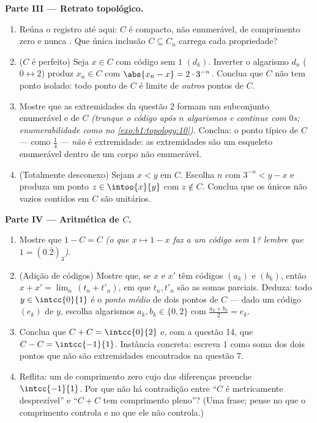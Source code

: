 \begin{problem}[{Problema de fim de semana --- o \omterm{pb:b1:topology:1}{conjunto de Cantor}
dos terços médios: comprimento zero, não enumerável, perfeito e $C + C =
\intcc{0}{2}$}]
\medskip
\noindent\textbf{Parte III --- Retrato topológico.}
\begin{enumerate}
  \item Reúna o registro até aqui: $C$ é compacto, não enumerável,
        de comprimento zero e nunca . Que única inclusão
        $C \subseteq C_n$ carrega cada propriedade?
  \item ($C$ é perfeito) Seja $x \in C$ com código sem $1$
        $(d_k)$. Inverter o algarismo $d_n$ ($0 \leftrightarrow
        2$) produz $x_n \in C$ com $\abs{x_n - x} = 2 \cdot
        3^{-n}$. Conclua que $C$ não tem ponto isolado: todo
        ponto de $C$ é limite de \emph{outros} pontos de $C$.
  \item Mostre que as extremidades da questão 2 formam um subconjunto
        enumerável e  de $C$ \emph{(trunque o código após $n$
        algarismos e continue com $0$s; enumerabilidade como no
        \cref{exo:b1:topology:10})}. Conclua: o ponto típico
        de $C$ --- como $\frac14$ --- \emph{não} é extremidade:
        as extremidades são um esqueleto enumerável dentro de um corpo
        não enumerável.
  \item (Totalmente desconexo) Sejam $x < y$ em $C$. Escolha $n$
        com $3^{-n} < y - x$ e produza um ponto $z \in
        \intoo{x}{y}$ com $z \notin C$. Conclua que os únicos
         não vazios contidos em $C$ são  unitários.
\end{enumerate}

\medskip
\noindent\textbf{Parte IV --- Aritmética de $C$.}
\begin{enumerate}
  \item Mostre que $1 - C = C$ \emph{(o que $x \mapsto 1 - x$ faz
        a um código sem $1$? lembre que $1 = (0.\overline{2})_3$)}.
  \item (Adição de códigos) Mostre que, se $x$ e $x'$ têm códigos
        $(a_k)$ e $(b_k)$, então $x + x' = \lim_n\,(t_n + t'_n)$,
        em que $t_n, t'_n$ são as somas parciais. Deduza: todo $y
        \in \intcc{0}{1}$ é o \emph{ponto médio} de dois pontos
        de $C$ --- dado um código $(e_k)$ de $y$, escolha algarismos
        $a_k, b_k \in \{0, 2\}$ com $\frac{a_k + b_k}{2} =
        e_k$.
  \item Conclua que $C + C = \intcc{0}{2}$ e, com a questão 14,
        que $C - C = \intcc{-1}{1}$. Instância concreta: escreva $1$ como
        soma dos dois pontos que não são extremidades encontrados na
        questão 7.
  \item Reflita: um  de comprimento zero cujo  das
        diferenças preenche $\intcc{-1}{1}$. Por que não há contradição
        entre ``$C$ é metricamente desprezível'' e ``$C + C$ tem
        comprimento pleno''? (Uma frase; pense no que o comprimento
        controla e no que ele não controla.)
\end{enumerate}


\end{problem}
